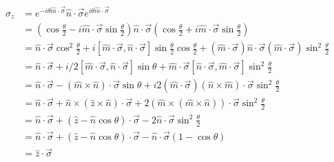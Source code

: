 \documentclass[10pt,a4paper,final]{article}
\begin{document}
\begin{align*}
\sigma_z &= e^{-i \theta \hat{m} \cdot \vec{\sigma} } \hat{n} \cdot \vec{\sigma} e^{i \theta \hat{m} \cdot \vec{\sigma} } \\
	&= \left( \cos \frac{\theta}{2} - i \hat{m} \cdot \vec{\sigma} \sin \frac{\theta}{2} \right) \hat{n} \cdot \vec{\sigma} \left( \cos \frac{\theta}{2} + i \hat{m} \cdot \vec{\sigma} \sin \frac{\theta}{2} \right) \\
	&= \hat{n} \cdot \vec{\sigma} \cos^2 \frac{\theta}{2} + i \left[ \hat{m} \cdot \vec{\sigma}, \hat{n} \cdot \vec{\sigma} \right] \sin \frac{\theta}{2} \cos \frac{\theta}{2} + (\hat{m} \cdot \vec{\sigma})\hat{n} \cdot \vec{\sigma}(\hat{m} \cdot \vec{\sigma}) \sin^2 \frac{\theta}{2} \\
	&= \hat{n} \cdot \vec{\sigma} + i/2 \left[ \hat{m} \cdot \vec{\sigma}, \hat{n} \cdot \vec{\sigma} \right] \sin \theta + \hat{m} \cdot \vec{\sigma} \left[\hat{n} \cdot \vec{\sigma}, \hat{m} \cdot \vec{\sigma}\right] \sin^2 \frac{\theta}{2} \\
	&= \hat{n} \cdot \vec{\sigma} - (\hat{m} \times \hat{n}) \cdot \vec{\sigma} \sin \theta + i 2 (\hat{m} \cdot \vec{\sigma}) (\hat{n} \times \hat{m}) \cdot \vec{\sigma} \sin^2 \frac{\theta}{2} \\
	&= \hat{n} \cdot \vec{\sigma} + \hat{n} \times (\hat{z} \times \hat{n}) \cdot \vec{\sigma} + 2 (\hat{m} \times (\hat{m} \times \hat{n})) \cdot \vec{\sigma} \sin^2 \frac{\theta}{2} \\
	&= \hat{n} \cdot \vec{\sigma} + (\hat{z} - \hat{n} \cos \theta)  \cdot \vec{\sigma} - 2 \hat{n} \cdot \vec{\sigma} \sin^2 \frac{\theta}{2} \\
	&= \hat{n} \cdot \vec{\sigma} + (\hat{z} - \hat{n} \cos \theta)  \cdot \vec{\sigma} - \hat{n} \cdot \vec{\sigma} (1 - \cos \theta) \\
	&= \hat{z} \cdot \vec{\sigma}
\end{align*}
\end{document}
